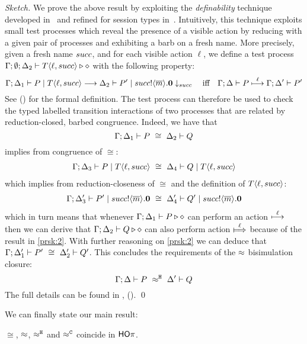 \begin{proof}[Sketch]	
	We prove the above result by exploiting
the \emph{definability} technique developed in~\cite[\S6.7]{Hennessy07} and
refined for session types in~\cite{KYHH2015,KY2015}.
Intuitively, this technique exploits small test processes which
reveal the presence of a visible action by reducing with a given pair of processes
and exhibiting a barb on a fresh name.
More precisely, given a fresh name $succ$, and for each visible action $\ell$, we define 
		a  test process
	$\Gamma; \emptyset; \Delta_2 \vdash T\langle \ell, succ \rangle \triangleright \diamond$
	with the following property:
%
	\[
		\Gamma; \Delta_1 \vdash P \;|\; T\langle \ell, succ \rangle \longrightarrow \Delta_2 \vdash P' \;|\; succ ! \langle \overline{m} \rangle . \mathbf{0} \downarrow_{succ}
		\quad \mbox{iff} \quad
		\Gamma; \Delta \vdash P \stackrel{\ell}{\longmapsto} \Gamma; \Delta' \vdash P'
	\]
%
	See  () for the formal definition.
	The test process can therefore be used to check the
	typed labelled transition interactions of two
	processes that are related by reduction-closed,
	barbed congruence. Indeed, we have that 
	\[
		\Gamma; \Delta_1 \vdash P\ \cong\ \Delta_2 \vdash Q
	\]
	implies from congruence of $\cong$:
	\begin{eqnarray*}
		\Gamma; \Delta_3 \vdash P \;|\; T\langle \ell, succ \rangle\ \cong\ \Delta_4 \vdash Q \;|\; T\langle \ell, succ \rangle
	\end{eqnarray*}
	which implies from reduction-closeness of $\cong$ and the definition of $T\langle \ell, succ \rangle$:
	\begin{eqnarray}
		\Gamma; \Delta_3' \vdash P' \;|\; succ ! \langle \overline{m} \rangle . \mathbf{0}\ \cong\ \Delta_4' \vdash Q' \;|\; succ ! \langle \overline{m} \rangle . \mathbf{0}
		\label{prsk:2}
	\end{eqnarray}
	which in turn means that whenever $\Gamma; \Delta_1 \vdash P \triangleright \diamond$ can
	perform an action $\stackrel{\ell}{\longmapsto}$ then we can derive that $\Gamma; \Delta_2 \vdash Q \triangleright \diamond$
	can also perform action $\Hby{\ell}$ because of the result in \eqref{prsk:2}. With further
	reasoning on \eqref{prsk:2} we can deduce that
	$\Gamma; \Delta_1' \vdash P'\ \cong\ \Delta_2' \vdash Q'$.
	This concludes the requirements of the $\approx$ bisimulation closure:
	\[
		\Gamma; \Delta \vdash P\ \approx^\mathtt{H}\ \Delta' \vdash Q
	\]
	The full details can be found in  ,  ().
	\qed
\end{proof}

We can finally state our main result:
\begin{theorem}[Coincidence]
	\label{the:coincidence}
	$\cong$, $\approx$, $\approx^\mathtt{H}$ and $\approx^\mathtt{C}$ coincide in $\mathsf{HO}\pi$. 
\end{theorem}

